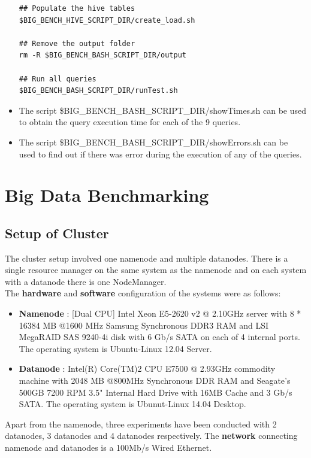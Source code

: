 \documentclass[12pt]{book}
\begin{document}
\begin{itemize}
\begin{lstlisting}[caption="Run the Benchmark",frame=single]
## Populate the hive tables
$BIG_BENCH_HIVE_SCRIPT_DIR/create_load.sh

## Remove the output folder
rm -R $BIG_BENCH_BASH_SCRIPT_DIR/output

## Run all queries
$BIG_BENCH_BASH_SCRIPT_DIR/runTest.sh

\end{lstlisting}

\item The script \$BIG\_BENCH\_BASH\_SCRIPT\_DIR/showTimes.sh can be used to obtain the query execution time for each of the 9 queries.

\item The script \$BIG\_BENCH\_BASH\_SCRIPT\_DIR/showErrors.sh can be used to find out if there was error during the execution of any of
the queries.
\end{itemize}



\chapter{Big Data Benchmarking}
\section{Setup of Cluster}
The cluster setup involved one namenode and multiple datanodes. There is a single resource manager on the same system as the namenode
and on each system with a datanode there is one NodeManager.\\\noindent
The \textbf{hardware} and \textbf{software} configuration of the systems were as follows:
\begin{itemize}
 \item \textbf{Namenode} : [Dual CPU] Intel Xeon E5-2620 v2 @ 2.10GHz server with 8 * 16384 MB @1600 MHz Samsung Synchronous DDR3 RAM and 
 LSI MegaRAID SAS 9240-4i disk with 6 Gb/s SATA on each of 4 internal ports. The operating system is Ubuntu-Linux 12.04 Server.
 \item \textbf{Datanode} : Intel(R) Core(TM)2 CPU E7500  @ 2.93GHz commodity machine with 2048 MB @800MHz Synchronous DDR RAM and Seagate's
 500GB 7200 RPM 3.5" Internal Hard Drive with 16MB Cache and 3 Gb/s SATA. The operating system is Ubunut-Linux 14.04 Desktop.
\end{itemize}
Apart from the namenode, three experiments have been conducted with 2 datanodes, 3 datanodes and 4 datanodes respectively.
The \textbf{network} connecting namenode and datanodes is a 100Mb/s Wired Ethernet.
\end{document}
